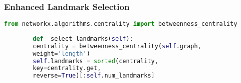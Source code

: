 	\subsubsection*{Enhanced Landmark Selection}
	\begin{lstlisting}[language=Python]
		from networkx.algorithms.centrality import betweenness_centrality
		
		def _select_landmarks(self):
		centrality = betweenness_centrality(self.graph,
		weight='length')
		self.landmarks = sorted(centrality,
		key=centrality.get,
		reverse=True)[:self.num_landmarks]
	\end{lstlisting}
	

